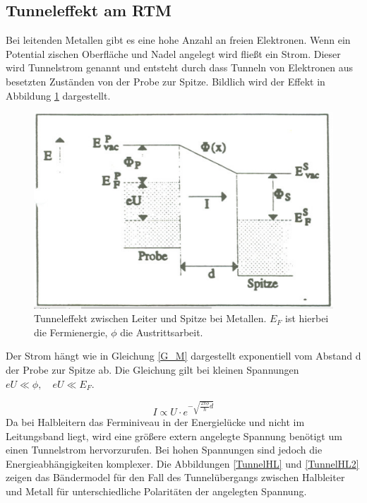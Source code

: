\subsection{Tunneleffekt am RTM}
Bei leitenden Metallen gibt es eine hohe Anzahl an freien Elektronen. Wenn ein Potential zischen Oberfläche und Nadel angelegt wird fließt ein Strom. Dieser wird Tunnelstrom genannt und entsteht durch dass Tunneln von Elektronen aus besetzten Zuständen von der Probe zur Spitze. Bildlich wird der Effekt in Abbildung \ref{TunnelM} dargestellt.
\begin{figure}[ht]
	\includegraphics[scale=0.4]{Bild/TunnelstromM}
	\centering
	\caption[Tunneleffekt zwischen Leiter und Spitze bei Metallen]{Tunneleffekt zwischen Leiter und Spitze bei Metallen. $E_F$ ist hierbei die Fermienergie, $\phi$ die Austrittsarbeit.\cite{Staatsexam}}
	\label{TunnelM}
\end{figure}
Der Strom hängt wie in Gleichung \ref{G_M} dargestellt exponentiell vom Abstand d der Probe zur Spitze ab. Die Gleichung gilt bei kleinen Spannungen $eU\ll\phi,\quad eU\ll E_F$.\par
\begin{equation}
	I\propto U\cdot e^{-\sqrt{\frac{2\pi\phi}{\hbar}d}}
	\label{G_M}
\end{equation}
Da bei Halbleitern das Ferminiveau in der Energielücke und nicht im Leitungsband liegt, wird eine
größere extern angelegte Spannung benötigt um einen Tunnelstrom hervorzurufen. Bei hohen Spannungen sind jedoch die Energieabhängigkeiten komplexer. Die Abbildungen \ref{TunnelHL} und \ref{TunnelHL2} zeigen das Bändermodel für den Fall des Tunnelübergangs zwischen Halbleiter und Metall für unterschiedliche Polaritäten der angelegten Spannung.\\
